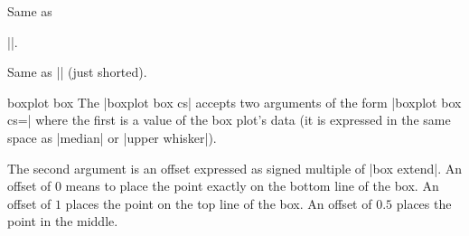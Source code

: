\begin{command}{\pgfplotsboxplotvalue{}}
	Same as 

	||.

\end{command}

\begin{command}{\boxplotvalue{}}
	Same as |\pgfplotsboxplotvalue| (just shorted).
\end{command}

\begin{coordinatesystem}{boxplot box}%
	The |boxplot box cs| accepts two arguments of the form
 |boxplot box cs=|
	where the first is a value of the box plot's data (it is expressed in the same space as |median| or |upper whisker|). 

	The second argument is an offset expressed as signed multiple of |box extend|. An offset of $0$ means to place the point exactly on the bottom line of the box. An offset of $1$ places the point on the top line of the box. An offset of $0.5$ places the point in the middle.

\begin{codeexample}[]
\end{codeexample}
\end{coordinatesystem}

